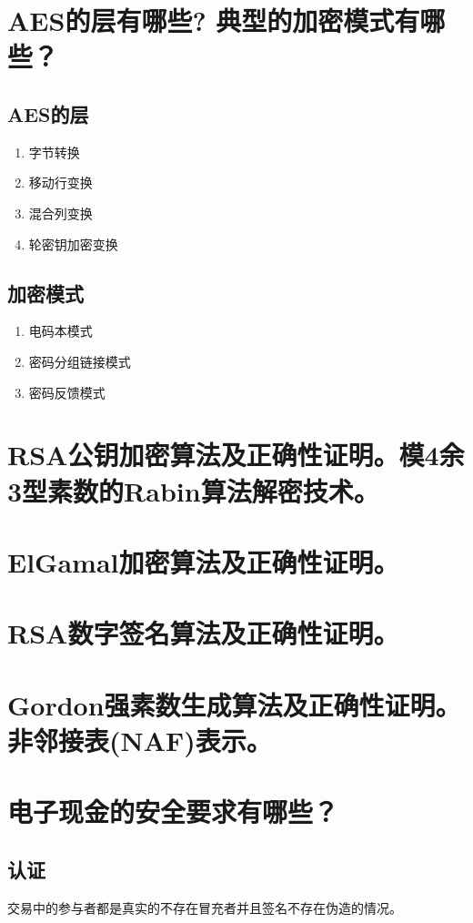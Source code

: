 \documentclass[11pt,a4paper]{article}
\begin{document}
\section{AES的层有哪些? 典型的加密模式有哪些？}

\subsection{AES的层}
\begin{enumerate}
\item 字节转换
\item 移动行变换
\item 混合列变换
\item 轮密钥加密变换
\end{enumerate}
\subsection{加密模式}
\begin{enumerate}
\item 电码本模式
\item 密码分组链接模式
\item 密码反馈模式
\end{enumerate}
\section{RSA公钥加密算法及正确性证明。模4余3型素数的Rabin算法解密技术。}

\section{ElGamal加密算法及正确性证明。}

\section{RSA数字签名算法及正确性证明。}

\section{Gordon强素数生成算法及正确性证明。非邻接表(NAF)表示。}

\section{电子现金的安全要求有哪些？}
\subsection{认证}交易中的参与者都是真实的不存在冒充者并且签名不存在伪造的情况。
\end{document}
